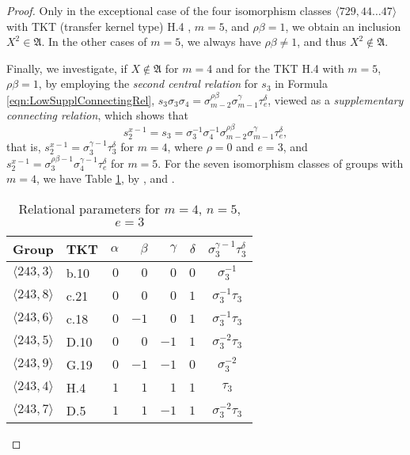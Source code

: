 \documentclass{amsart}
\theoremstyle{definition}
\numberwithin{equation}{section}
\begin{document}
\begin{proof}
\noindent
Only in the exceptional case of the four isomorphism classes \(\langle 729,44\ldots 47\rangle\)
with TKT (transfer kernel type) H.4
\cite{Ma2},
\(m=5\), and \(\rho\beta=1\), we obtain an inclusion \(X^2\in\mathfrak{A}\).
In the other cases of \(m=5\), we always have \(\rho\beta\ne 1\), and thus \(X^2\not\in\mathfrak{A}\).

\noindent
Finally, we investigate,
if \(X\not\in\mathfrak{A}\) for \(m=4\) and for the TKT H.4 with \(m=5\), \(\rho\beta=1\),
by employing the \textit{second central relation} for \(s_3\) in Formula
\eqref{eqn:LowSupplConnectingRel},
\(s_3\sigma_3\sigma_4=\sigma_{m-2}^{\rho\beta}\sigma_{m-1}^\gamma\tau_e^\delta\),
viewed as a \textit{supplementary connecting relation},
which shows that
\[s_2^{x-1}=s_3=\sigma_3^{-1}\sigma_4^{-1}\sigma_{m-2}^{\rho\beta}\sigma_{m-1}^\gamma\tau_e^\delta,\]
that is, \(s_2^{x-1}=\sigma_3^{\gamma-1}\tau_3^\delta\) for \(m=4\), where \(\rho=0\) and \(e=3\),
and \(s_2^{x-1}=\sigma_3^{\rho\beta-1}\sigma_4^{\gamma-1}\tau_e^\delta\) for \(m=5\).
For the seven isomorphism classes of groups with \(m=4\),
we have Table
\ref{tbl:SmlBicExpX},
by
\cite[p. 1--3]{Ne2},
and
\cite{BEO2}.

\begin{table}[ht]
\caption{Relational parameters for \(m=4\), \(n=5\), \(e=3\)}
\label{tbl:SmlBicExpX}
\begin{center}
\begin{tabular}{|c|l|rrrr|c|}
\hline
 Group                    & TKT  & \(\alpha\) & \(\beta\) & \(\gamma\) & \(\delta\) & \(\sigma_3^{\gamma-1}\tau_3^\delta\) \\
\hline
 \(\langle 243,3\rangle\) & b.10 &      \(0\) &     \(0\) &      \(0\) &      \(0\) &                    \(\sigma_3^{-1}\) \\
 \(\langle 243,8\rangle\) & c.21 &      \(0\) &     \(0\) &      \(0\) &      \(1\) &              \(\sigma_3^{-1}\tau_3\) \\
 \(\langle 243,6\rangle\) & c.18 &      \(0\) &    \(-1\) &      \(0\) &      \(1\) &              \(\sigma_3^{-1}\tau_3\) \\
 \(\langle 243,5\rangle\) & D.10 &      \(0\) &     \(0\) &     \(-1\) &      \(1\) &              \(\sigma_3^{-2}\tau_3\) \\
 \(\langle 243,9\rangle\) & G.19 &      \(0\) &    \(-1\) &     \(-1\) &      \(0\) &                    \(\sigma_3^{-2}\) \\
 \(\langle 243,4\rangle\) & H.4  &      \(1\) &     \(1\) &      \(1\) &      \(1\) &                           \(\tau_3\) \\
 \(\langle 243,7\rangle\) & D.5  &      \(1\) &     \(1\) &     \(-1\) &      \(1\) &              \(\sigma_3^{-2}\tau_3\) \\
\hline
\end{tabular}
\end{center}
\end{table}


\end{proof}
\end{document}
